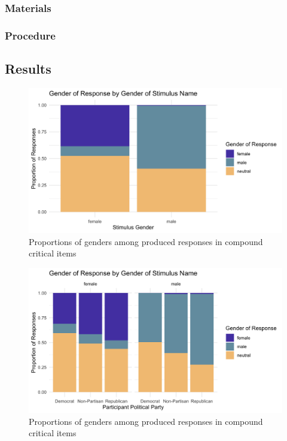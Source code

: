 \documentclass{article}
\begin{document}
	\subsubsection{Materials}
	
	\subsubsection{Procedure}
	
	\subsection{Results}
	
	\begin{figure}[h!]
		\centering
		\includegraphics[scale=0.2]{prod_results_cumulative.png}
		\caption{Proportions of genders among produced responses in compound critical items}
	\end{figure}

	\begin{figure}[h!]
	\centering
	\includegraphics[scale=0.2]{prod_comp_party.png}
	\caption{Proportions of genders among produced responses in compound critical items}
	\end{figure}
\end{document}

